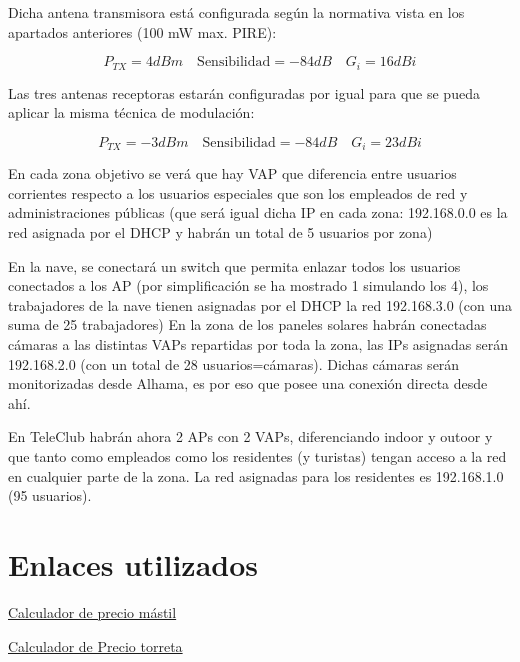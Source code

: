 \documentclass{article}
\begin{document}
\quad

Dicha antena transmisora está configurada según la normativa vista en los apartados anteriores (100 mW max. PIRE): 

$$P_{TX} = 4dBm \quad \text{Sensibilidad}=-84dB \quad G_i=16 dBi$$

Las tres antenas receptoras estarán configuradas por igual para que se pueda aplicar la misma técnica de modulación: 

$$P_{TX} = -3dBm \quad \text{Sensibilidad}=-84dB \quad G_i=23 dBi$$

En cada zona objetivo se verá que hay VAP que diferencia entre usuarios corrientes respecto a los usuarios especiales que son los empleados de red y administraciones públicas (que será igual dicha IP en cada zona: 192.168.0.0 es la red asignada por el DHCP y habrán un total de 5 usuarios por zona)

\quad

En la nave, se conectará un switch que permita enlazar todos los usuarios conectados a los AP (por simplificación se ha mostrado 1 simulando los 4), los trabajadores de la nave tienen asignadas por el DHCP la red 192.168.3.0 (con una suma de 25 trabajadores)
En la zona de los paneles solares habrán conectadas cámaras a las distintas VAPs repartidas por toda la zona, las IPs asignadas serán 192.168.2.0 (con un total de 28 usuarios=cámaras). Dichas cámaras serán monitorizadas desde Alhama, es por eso que posee una conexión directa desde ahí.

\quad

En TeleClub habrán ahora 2 APs con 2 VAPs, diferenciando indoor y outoor y que tanto como empleados como los residentes (y turistas) tengan acceso a la red en cualquier parte de la zona. La red asignadas para los residentes es 192.168.1.0 (95 usuarios).

\newpage

\section{Enlaces utilizados}

\quad

\quad

\href{https://www.generadordeprecios.info/obra_nueva/Instalaciones/Audiovisuales/Red_de_cables_coaxiales/Mastil_para_fijacion_de_antenas.html#gsc.tab=0}{Calculador de precio mástil}

\quad

\href{https://generadordeprecios.info/obra_nueva/calculaprecio.asp?Valor=0|0_0_0_0|1|IAA032|iaa_032:_0_0_0_0_0_1_0#gsc.tab=0}{Calculador de Precio torreta}
\end{document}
